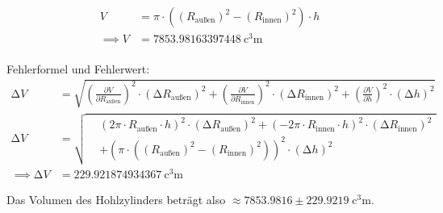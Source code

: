         \begin{align}
            V &=\pi \cdot ((R_\text{außen})^2 - (R_\text{innen})^2) \cdot h \\
            \implies V &= \SI{7853.98163397448}{\cubic\centi\metre}
        \end{align}
        \\
        Fehlerformel und Fehlerwert:
        \begin{align}
            \increment V &= \sqrt{
                \left(\frac{\partial V}{\partial R_\text{außen} }\right)^2 \cdot \left(\increment R_\text{außen} \right)^2 +
                \left(\frac{\partial V}{\partial R_\text{innen} }\right)^2 \cdot \left(\increment R_\text{innen} \right)^2 +
                \left(\frac{\partial V}{\partial h }\right)^2 \cdot \left(\increment h \right)^2
                }\\
        \increment V&=
        \sqrt{
        \begin{aligned}
                & \left(
                2 \pi \cdot R_\text{außen} \cdot h \right) ^2 \cdot (\increment R_\text{außen} )^2
                + \left( -2 \pi \cdot R_\text{innen} \cdot h \right) ^2 \cdot (\increment R_\text{innen} )^2 \\
                &+ \left( \pi \cdot ((R_\text{außen})^2 - (R_\text{innen})^2) \right) ^2 \cdot (\increment h )^2
        \end{aligned}
        }\\
        \implies \increment V &= \SI{229.921874934367}{\cubic\centi\metre}
    \end{align}
            
Das Volumen des Hohlzylinders beträgt also $\approx7853.9816\pm 229.9219\; \si{\cubic\centi\metre}$.

